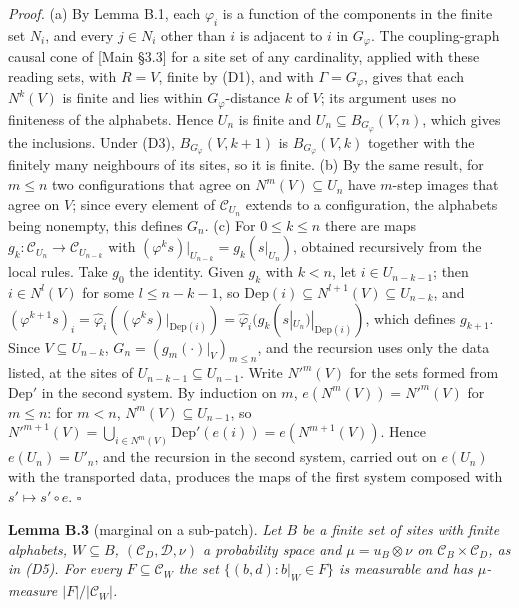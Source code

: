 \documentclass[
]{article}
\begin{document}
\emph{Proof.} (a) By Lemma B.1, each \(\varphi_i\) is a function of the
components in the finite set \(N_i\), and every \(j \in N_i\) other than
\(i\) is adjacent to \(i\) in \(G_\varphi\). The coupling-graph causal
cone of {[}Main §3.3{]} for a site set of any cardinality, applied with
these reading sets, with \(R = V\), finite by (D1), and with
\(\Gamma = G_\varphi\), gives that each \(N^k(V)\) is finite and lies
within \(G_\varphi\)-distance \(k\) of \(V\); its argument uses no
finiteness of the alphabets. Hence \(U_n\) is finite and
\(U_n \subseteq B_{G_\varphi}(V, n)\), which gives the inclusions. Under
(D3), \(B_{G_\varphi}(V, k+1)\) is \(B_{G_\varphi}(V, k)\) together with
the finitely many neighbours of its sites, so it is finite. (b) By the
same result, for \(m \leq n\) two configurations that agree on
\(N^m(V) \subseteq U_n\) have \(m\)-step images that agree on \(V\);
since every element of \(\mathcal{C}_{U_n}\) extends to a configuration,
the alphabets being nonempty, this defines \(G_n\). (c) For
\(0 \leq k \leq n\) there are maps
\(g_k : \mathcal{C}_{U_n} \to \mathcal{C}_{U_{n-k}}\) with
\((\varphi^k s)|_{U_{n-k}} = g_k(s|_{U_n})\), obtained recursively from
the local rules. Take \(g_0\) the identity. Given \(g_k\) with
\(k < n\), let \(i \in U_{n-k-1}\); then \(i \in N^l(V)\) for some
\(l \leq n-k-1\), so
\(\mathrm{Dep}(i) \subseteq N^{l+1}(V) \subseteq U_{n-k}\), and
\((\varphi^{k+1} s)_i = \hat\varphi_i((\varphi^k s)|_{\mathrm{Dep}(i)}) = \hat\varphi_i(g_k(s|_{U_n})|_{\mathrm{Dep}(i)})\),
which defines \(g_{k+1}\). Since \(V \subseteq U_{n-k}\),
\(G_n = (g_m(\cdot)|_V)_{m \leq n}\), and the recursion uses only the
data listed, at the sites of \(U_{n-k-1} \subseteq U_{n-1}\). Write
\(N'^m(V)\) for the sets formed from \(\mathrm{Dep}'\) in the second
system. By induction on \(m\), \(e(N^m(V)) = N'^m(V)\) for \(m \leq n\):
for \(m < n\), \(N^m(V) \subseteq U_{n-1}\), so
\(N'^{m+1}(V) = \bigcup_{i \in N^m(V)} \mathrm{Dep}'(e(i)) = e(N^{m+1}(V))\).
Hence \(e(U_n) = U'_n\), and the recursion in the second system, carried
out on \(e(U_n)\) with the transported data, produces the maps of the
first system composed with \(s' \mapsto s' \circ e\). \(\square\)

\textbf{Lemma B.3} (marginal on a sub-patch). \emph{Let \(B\) be a
finite set of sites with finite alphabets, \(W \subseteq B\),
\((\mathcal{C}_D, \mathcal{D}, \nu)\) a probability space and
\(\mu = u_B \otimes \nu\) on \(\mathcal{C}_B \times \mathcal{C}_D\), as
in (D5). For every \(F \subseteq \mathcal{C}_W\) the set
\(\{(b, d) : b|_W \in F\}\) is measurable and has \(\mu\)-measure
\(|F|/|\mathcal{C}_W|\).}
\end{document}
